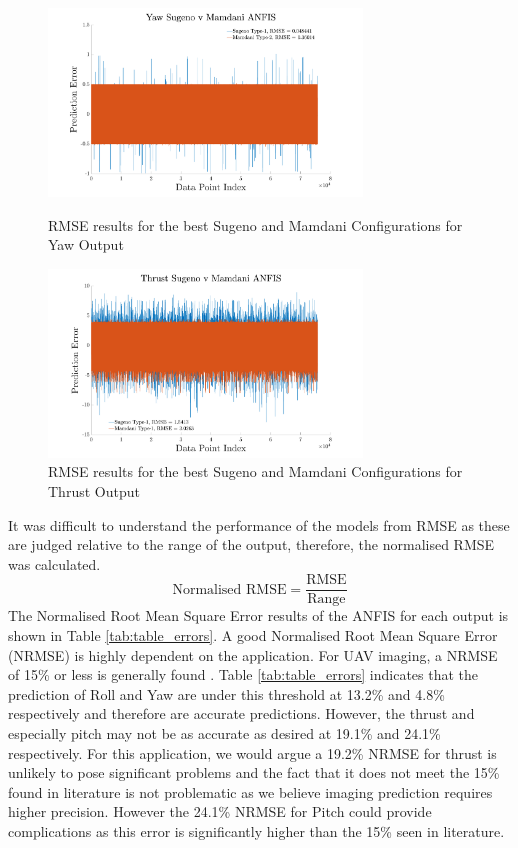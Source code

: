 \begin{figure}[H]
    \centering
    \begin{minipage}[b]{0.45\textwidth}
        \centering
        \includegraphics[height=5cm,keepaspectratio]{img/Yaw SvM.pdf}
        \caption{RMSE results for the best Sugeno and Mamdani Configurations for Yaw Output}
        \label{fig:yaw_SvM}
    \end{minipage}
    \hfill
    \begin{minipage}[b]{0.45\textwidth}
        \centering
        \includegraphics[height=5cm,keepaspectratio]{img/Thrust SvM.pdf}
        \caption{RMSE results for the best Sugeno and Mamdani Configurations for Thrust Output}
        \label{fig:thrust_SvM}
    \end{minipage}
\end{figure}
It was difficult to understand the performance of the models from RMSE as these are judged relative to the range of the output, therefore, the normalised RMSE was calculated. 
\begin{equation}
\text{Normalised RMSE} = \frac{\text{RMSE}}{\text{Range}}
\end{equation}
The Normalised Root Mean Square Error results of the ANFIS for each output is shown in Table \ref{tab:table_errors}. A good Normalised Root Mean Square Error (NRMSE) is highly dependent on the application. For UAV imaging, a NRMSE of 15\% or less is generally found \cite{zain4}. Table \ref{tab:table_errors} indicates that the prediction of Roll and Yaw are under this threshold at 13.2\% and 4.8\% respectively and therefore are accurate predictions. However, the thrust and especially pitch may not be as accurate as desired at 19.1\% and 24.1\% respectively. For this application, we would argue a 19.2\% NRMSE for thrust is unlikely to pose significant problems and the fact that it does not meet the 15\% found in literature is not problematic as we believe imaging prediction requires higher precision. However the 24.1\% NRMSE for Pitch could provide complications as this error is significantly higher than the 15\% seen in literature.
